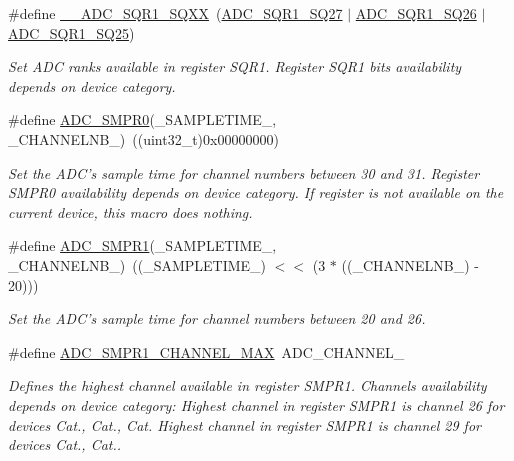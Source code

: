 \begin{DoxyCompactItemize}
\item 
\#define \hyperlink{group___a_d_c_ex___private___macro_gaaeadff15bb18b98df58b98fc0f57b697}{\-\_\-\-\_\-\-A\-D\-C\-\_\-\-S\-Q\-R1\-\_\-\-S\-Q\-X\-X}~(\hyperlink{group___peripheral___registers___bits___definition_gaf974f4fc66a9cdce8bba4572fe2541a1}{A\-D\-C\-\_\-\-S\-Q\-R1\-\_\-\-S\-Q27} $\vert$ \hyperlink{group___peripheral___registers___bits___definition_gaee53f1b8c03f22d6b5fca762ea286932}{A\-D\-C\-\_\-\-S\-Q\-R1\-\_\-\-S\-Q26} $\vert$ \hyperlink{group___peripheral___registers___bits___definition_gaadcbe44419351e6f9ce90e37f8395441}{A\-D\-C\-\_\-\-S\-Q\-R1\-\_\-\-S\-Q25})
\begin{DoxyCompactList}\small\item\em Set A\-D\-C ranks available in register S\-Q\-R1. Register S\-Q\-R1 bits availability depends on device category. \end{DoxyCompactList}\item 
\#define \hyperlink{group___a_d_c_ex___private___macro_ga9905dad6b9c2d9173ce71ef8799f2eeb}{A\-D\-C\-\_\-\-S\-M\-P\-R0}(\-\_\-\-S\-A\-M\-P\-L\-E\-T\-I\-M\-E\-\_\-, \-\_\-\-C\-H\-A\-N\-N\-E\-L\-N\-B\-\_\-)~((uint32\-\_\-t)0x00000000)
\begin{DoxyCompactList}\small\item\em Set the A\-D\-C's sample time for channel numbers between 30 and 31. Register S\-M\-P\-R0 availability depends on device category. If register is not available on the current device, this macro does nothing. \end{DoxyCompactList}\item 
\#define \hyperlink{group___a_d_c_ex___private___macro_ga29f7414128fbbdb81db6ea6ede449f4b}{A\-D\-C\-\_\-\-S\-M\-P\-R1}(\-\_\-\-S\-A\-M\-P\-L\-E\-T\-I\-M\-E\-\_\-, \-\_\-\-C\-H\-A\-N\-N\-E\-L\-N\-B\-\_\-)~((\-\_\-\-S\-A\-M\-P\-L\-E\-T\-I\-M\-E\-\_\-) $<$$<$ (3 $\ast$ ((\-\_\-\-C\-H\-A\-N\-N\-E\-L\-N\-B\-\_\-) -\/ 20)))
\begin{DoxyCompactList}\small\item\em Set the A\-D\-C's sample time for channel numbers between 20 and 26. \end{DoxyCompactList}\item 
\#define \hyperlink{group___a_d_c_ex___private___macro_ga69676d151f6b7ebf3ada32907f78fe00}{A\-D\-C\-\_\-\-S\-M\-P\-R1\-\_\-\-C\-H\-A\-N\-N\-E\-L\-\_\-\-M\-A\-X}~A\-D\-C\-\_\-\-C\-H\-A\-N\-N\-E\-L\-\_
\begin{DoxyCompactList}\small\item\em Defines the highest channel available in register S\-M\-P\-R1. Channels availability depends on device category\-: Highest channel in register S\-M\-P\-R1 is channel 26 for devices Cat., Cat., Cat. Highest channel in register S\-M\-P\-R1 is channel 29 for devices Cat., Cat.. \end{DoxyCompactList}\item 
$$
\end{DoxyCompactItemize}
